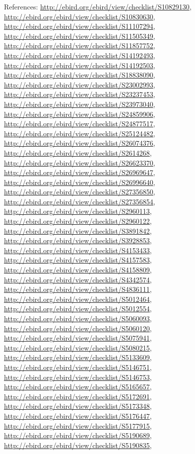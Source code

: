 \documentclass[9pt, article]{memoir}
\begin{document}
\begin{multicols}{2}
\vspace{6pt}References: 
\url{http://ebird.org/ebird/view/checklist/S10829130}, 
\url{http://ebird.org/ebird/view/checklist/S10830630}, 
\url{http://ebird.org/ebird/view/checklist/S11107294}, 
\url{http://ebird.org/ebird/view/checklist/S11505349}, 
\url{http://ebird.org/ebird/view/checklist/S11857752}, 
\url{http://ebird.org/ebird/view/checklist/S14192493}, 
\url{http://ebird.org/ebird/view/checklist/S14192503}, 
\url{http://ebird.org/ebird/view/checklist/S18838090}, 
\url{http://ebird.org/ebird/view/checklist/S23002993}, 
\url{http://ebird.org/ebird/view/checklist/S23237453}, 
\url{http://ebird.org/ebird/view/checklist/S23973040}, 
\url{http://ebird.org/ebird/view/checklist/S24859906}, 
\url{http://ebird.org/ebird/view/checklist/S24877517}, 
\url{http://ebird.org/ebird/view/checklist/S25124482}, 
\url{http://ebird.org/ebird/view/checklist/S26074376}, 
\url{http://ebird.org/ebird/view/checklist/S2614268}, 
\url{http://ebird.org/ebird/view/checklist/S26623370}, 
\url{http://ebird.org/ebird/view/checklist/S26969647}, 
\url{http://ebird.org/ebird/view/checklist/S26996640}, 
\url{http://ebird.org/ebird/view/checklist/S27356850}, 
\url{http://ebird.org/ebird/view/checklist/S27356854}, 
\url{http://ebird.org/ebird/view/checklist/S2960113}, 
\url{http://ebird.org/ebird/view/checklist/S2960122}, 
\url{http://ebird.org/ebird/view/checklist/S3891842}, 
\url{http://ebird.org/ebird/view/checklist/S3928853}, 
\url{http://ebird.org/ebird/view/checklist/S4153433}, 
\url{http://ebird.org/ebird/view/checklist/S4157583}, 
\url{http://ebird.org/ebird/view/checklist/S4158809}, 
\url{http://ebird.org/ebird/view/checklist/S4342574}, 
\url{http://ebird.org/ebird/view/checklist/S4836111}, 
\url{http://ebird.org/ebird/view/checklist/S5012464}, 
\url{http://ebird.org/ebird/view/checklist/S5012554}, 
\url{http://ebird.org/ebird/view/checklist/S5060093}, 
\url{http://ebird.org/ebird/view/checklist/S5060120}, 
\url{http://ebird.org/ebird/view/checklist/S5075941}, 
\url{http://ebird.org/ebird/view/checklist/S5080215}, 
\url{http://ebird.org/ebird/view/checklist/S5133609}, 
\url{http://ebird.org/ebird/view/checklist/S5146751}, 
\url{http://ebird.org/ebird/view/checklist/S5146753}, 
\url{http://ebird.org/ebird/view/checklist/S5165657}, 
\url{http://ebird.org/ebird/view/checklist/S5172691}, 
\url{http://ebird.org/ebird/view/checklist/S5173348}, 
\url{http://ebird.org/ebird/view/checklist/S5176447}, 
\url{http://ebird.org/ebird/view/checklist/S5177915}, 
\url{http://ebird.org/ebird/view/checklist/S5190689}, 
\url{http://ebird.org/ebird/view/checklist/S5190835}, 

\end{multicols}
\end{document}
